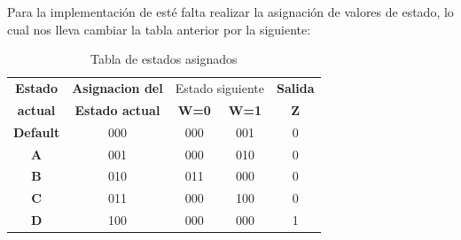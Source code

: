 \FloatBarrier
Para la implementación de esté falta realizar la asignación de valores de estado, lo cual nos lleva cambiar la tabla anterior por la siguiente:\\
\FloatBarrier
\begin{table}[h!]
	\begin{center}
		\caption{Tabla de estados asignados}
			\begin{tabular}{|c|c|c c|c|}
			\hline
			\textbf{Estado} & \textbf{Asignacion del} &\multicolumn{2}{|c|}{Estado siguiente} & \textbf{Salida}\\
			\textbf{actual}  & \textbf{Estado actual} & \textbf{ W=0 } & \textbf{ W=1 } & \textbf{Z}\\
			\hline
			\textbf{Default} & 000 & 000 &  001 & 0\\
			\hline
			\textbf{A} & 001 & 000 &  010 & 0\\
			\hline
			\textbf{B} & 010 & 011 & 000 & 0\\
			\hline
			\textbf{C} & 011 & 000 & 100 & 0\\
			\hline
			\textbf{D} & 100 & 000 & 000 & 1\\
			\hline
			\end{tabular}
	\end{center}
\end{table}
\FloatBarrier